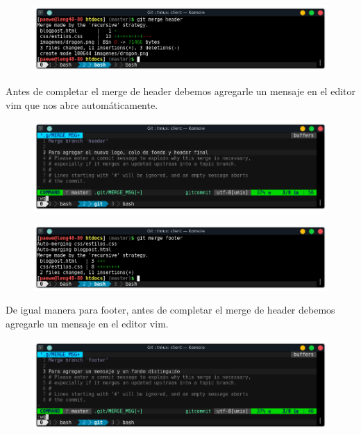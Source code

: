 \documentclass{article}
\begin{document}
\newpage

\begin{figure}[h!]
  \centering
  \includegraphics[scale=0.75]{./Pictures/296_merge_footer.png}
\end{figure}

Antes de completar el merge de header debemos agregarle un mensaje en el editor
vim que nos abre automáticamente.

\begin{figure}[h!]
  \centering
  \includegraphics[scale=0.75]{./Pictures/297_merge_message.png}
\end{figure}

\begin{figure}[h!]
  \centering
  \includegraphics[scale=0.75]{./Pictures/298_merge_footer.png}
\end{figure}

De igual manera para footer, antes de completar el merge de header debemos
agregarle un mensaje en el editor vim.

\begin{figure}[h!]
  \centering
  \includegraphics[scale=0.75]{./Pictures/299_merge_message.png}
\end{figure}
\end{document}
